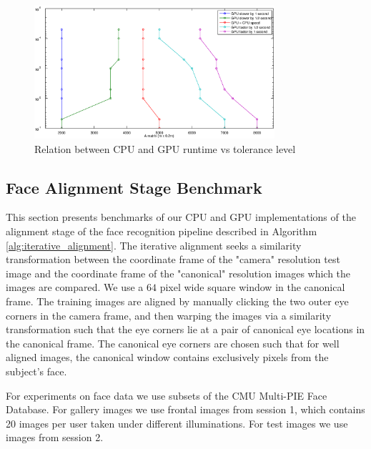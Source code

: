 \documentclass[10pt,twocolumn,letterpaper]{article}
\begin{document}
\begin{figure}
\begin{center}
\includegraphics[width=3.5in]{results/random_data/size_vs_speed_crossover_ratio_2}
\end{center}
\caption{Relation between CPU and GPU runtime vs tolerance level}
\label{fig:random_data2}
\end{figure}


\subsection{Face Alignment Stage Benchmark} 
\label{sec:alignment_benchmark}
This section presents benchmarks of our CPU and GPU implementations of the
alignment stage of the face recognition pipeline described in Algorithm
\ref{alg:iterative_alignment}.  The iterative alignment seeks a similarity
transformation between the coordinate frame of the "camera" resolution test
image and the coordinate frame of the "canonical" resolution images which the
images are compared.  We use a $64$ pixel wide square window in the canonical
frame.  The training images are aligned by manually clicking the two outer eye
corners in the camera frame, and then warping the images via a similarity
transformation such that the eye corners lie at a pair of canonical eye
locations in the canonical frame.  The canonical eye corners are chosen such
that for well aligned images, the canonical window contains exclusively pixels
from the subject's face. 

For experiments on face data we use subsets of the CMU Multi-PIE Face Database.
For gallery images we use frontal images from session 1, which contains 20
images per user taken under different illuminations. For test images we use
images from session 2.  
\end{document}
